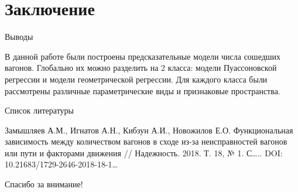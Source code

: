 \documentclass[aspectratio=169]{beamer}
\begin{document}
    \section{Заключение}
    \begin{frame}{Выводы}
        \begin{block}{}
            В данной работе были построены предсказательные модели числа сошедших вагонов. Глобально их можно разделить на 2 класса: модели Пуассоновской регрессии и модели геометрической регрессии. Для каждого класса были рассмотрены различные параметрические виды и признаковые пространства.
        \end{block}
    \end{frame}

    \begin{frame}{Список литературы}
        \begin{thebibliography}{00}
             Замышляев А.М., Игнатов А.Н., Кибзун А.И., Новожилов Е.О. Функциональная зависимость между количеством вагонов в сходе из-за неисправностей вагонов или пути и факторами движения // Надежность. 2018. Т. 18, № 1. С….. DOI: 10.21683/1729-2646-2018-18-1…
        \end{thebibliography}
     \end{frame}
    
    \begin{frame}{}
        \centering
        \Huge
        Спасибо за внимание!
    \end{frame}
\end{document}
